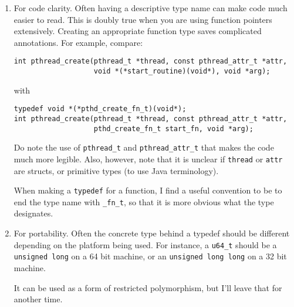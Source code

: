 \documentclass[11pt,onecolumn]{article}
\begin{document}
\begin{enumerate}[itemsep=0pt,topsep=1pt,parsep=1pt,leftmargin=2.5em]
\item For code clarity.  Often having a descriptive type name can make
  code much easier to read.  This is doubly true when you are using
  function pointers extensively.  Creating an appropriate function
  type saves complicated annotations.  For example, compare:

    \begin{minipage}{3in}
      \footnotesize
      \lstset{language=C}
      \begin{lstlisting}
int pthread_create(pthread_t *thread, const pthread_attr_t *attr,
                   void *(*start_routine)(void*), void *arg);
      \end{lstlisting}
    \end{minipage}

    with 

    \begin{minipage}{3in}
      \footnotesize
      \lstset{language=C}
      \begin{lstlisting}
typedef void *(*pthd_create_fn_t)(void*);
int pthread_create(pthread_t *thread, const pthread_attr_t *attr,
                   pthd_create_fn_t start_fn, void *arg);
      \end{lstlisting}
    \end{minipage}

    Do note the use of {\tt pthread\_t} and {\tt pthread\_attr\_t} that
    makes the code much more legible.  Also, however, note that it is
    unclear if {\tt thread} or {\tt attr} are structs, or primitive
    types (to use Java terminology).

    When making a {\tt typedef} for a function, I find a useful
    convention to be to end the type name with {\tt \_fn\_t}, so that
    it is more obvious what the type designates.
  \item For portability.  Often the concrete type behind a typedef
    should be different depending on the platform being used.  For
    instance, a {\tt u64\_t} should be a {\tt unsigned long} on a 64
    bit machine, or an {\tt unsigned long long} on a 32 bit machine.

    It can be used as a form of restricted polymorphism, but I'll
    leave that for another time.
\end{enumerate}

\end{document}
